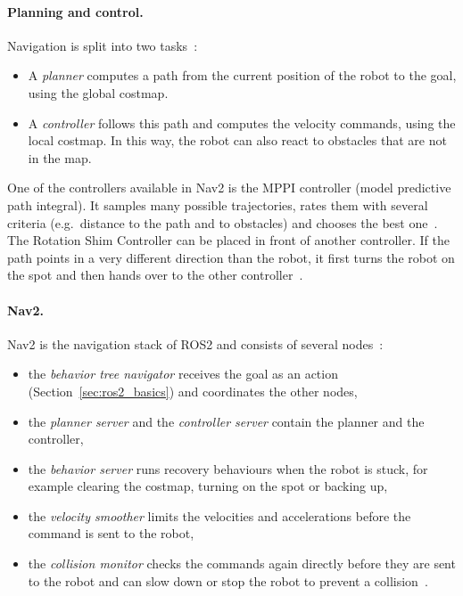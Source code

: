 \paragraph{Planning and control.} Navigation is split into two tasks~\citep{nav2_concepts}:
\begin{itemize}
  \item A \emph{planner} computes a path from the current position of the robot to the goal, using the global costmap.
  \item A \emph{controller} follows this path and computes the velocity commands, using the local costmap. In this way, the robot can also react to obstacles that are not in the map.
\end{itemize}
One of the controllers available in Nav2 is the MPPI controller (model predictive path integral). It samples many possible trajectories, rates them with several criteria (e.g.\ distance to the path and to obstacles) and chooses the best one~\citep{nav2_docs}. The Rotation Shim Controller can be placed in front of another controller. If the path points in a very different direction than the robot, it first turns the robot on the spot and then hands over to the other controller~\citep{nav2_rotation_shim}.

\paragraph{Nav2.} Nav2 is the navigation stack of ROS2 and consists of several nodes~\citep{nav2_concepts}:
\begin{itemize}
  \item the \emph{behavior tree navigator} receives the goal as an action (Section~\ref{sec:ros2_basics}) and coordinates the other nodes,
  \item the \emph{planner server} and the \emph{controller server} contain the planner and the controller,
  \item the \emph{behavior server} runs recovery behaviours when the robot is stuck, for example clearing the costmap, turning on the spot or backing up,
  \item the \emph{velocity smoother} limits the velocities and accelerations before the command is sent to the robot,
  \item the \emph{collision monitor} checks the commands again directly before they are sent to the robot and can slow down or stop the robot to prevent a collision~\citep{nav2_collision_monitor}.
\end{itemize}

